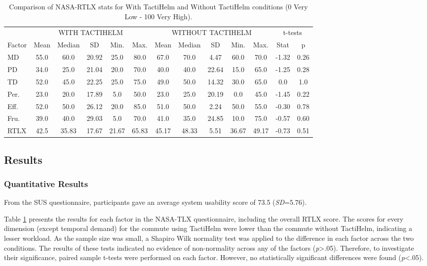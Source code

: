 \documentclass{mpaper}
\begin{document}
\begin{table}[h]
    \centering
    \begin{tabular}{l|ccccc|ccccc|cc}
    \multicolumn{1}{c|}{} & \multicolumn{5}{c|}{WITH TACTIHELM} & \multicolumn{5}{c|}{WITHOUT TACTIHELM} & \multicolumn{2}{c}{t-tests} \\ \cline{2-13}
    Factor & Mean & Median & SD & Min. & Max. & Mean & Median & SD & Min. & Max. & Stat & p \\ \hline
    MD & 55.0 & 60.0 & 20.92 & 25.0 & 80.0 & 67.0 & 70.0 & 4.47 & 60.0 & 70.0 & -1.32 & 0.26 \\
    PD & 34.0 & 25.0 & 21.04 & 20.0 & 70.0 & 40.0 & 40.0 & 22.64 & 15.0 & 65.0  & -1.25 & 0.28 \\
    TD & 52.0 & 45.0 & 22.25 & 25.0 & 75.0 & 49.0 & 50.0 & 14.32 & 30.0 & 65.0 & 0.0 & 1.0 \\
    Per. & 23.0 & 20.0 & 17.89 & 5.0 & 50.0 & 23.0 & 25.0 & 20.19 & 0.0 & 45.0 & -1.45 & 0.22 \\
    Eff. & 52.0 & 50.0 & 26.12 & 20.0 & 85.0 & 51.0 & 50.0 & 2.24 & 50.0 & 55.0  & -0.30 & 0.78 \\
    Fru. & 39.0 & 40.0 & 29.03 & 5.0 & 70.0 & 41.0 & 35.0 & 24.85 & 10.0 & 75.0 & -0.57 & 0.60 \\
    RTLX & 42.5 & 35.83 & 17.67 & 21.67 & 65.83 & 45.17 & 48.33 & 5.51 & 36.67 & 49.17 & -0.73 & 0.51 \\
    \end{tabular}
    \caption{Comparison of NASA-RTLX stats for With TactiHelm and Without TactiHelm conditions (0 Very Low - 100 Very High).}
    \label{tab:nasa-rtlx-stats}
\end{table}

\subsection{Results}
\subsubsection{Quantitative Results}
From the SUS questionnaire, participants gave an average system usability score of 73.5 (\textit{SD}=5.76).

Table \ref{tab:nasa-rtlx-stats} presents the results for each factor in the NASA-TLX questionnaire, including the overall RTLX score. The scores for every dimension (except temporal demand) for the commute using TactiHelm were lower than the commute without TactiHelm, indicating a lesser workload. As the sample size was small, a Shapiro Wilk normality test was applied to the difference in each factor across the two conditions. The results of these tests indicated no evidence of non-normality across any of the factors (\textit{p}>.05). Therefore, to investigate their significance, paired sample t-tests were performed on each factor. However, no statistically significant differences were found (\textit{p}<.05).
\end{document}
